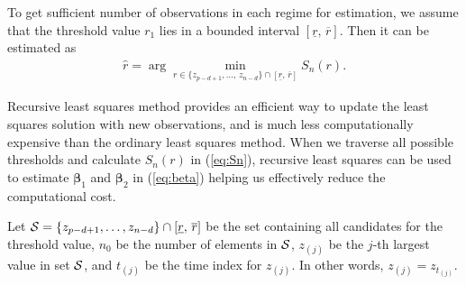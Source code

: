 To get sufficient number of observations in each regime for estimation, we assume that the threshold value $r_1$ lies in a bounded interval $[\underline{r}, \,\overline{r}]$. Then it can be estimated as
\begin{align}\label{eq:obj}
\hat{r}=\arg \min_{r \in \{z_{p-d+1},\ldots,\, z_{n-d}\} \cap [\underline{r},\, \overline{r}]} S_n(r).
\end{align}

 Recursive least squares method provides an efficient way to update the least squares solution with new observations, and is much less computationally expensive than the ordinary least squares method. When we traverse all possible thresholds and calculate $S_n(r)$ in (\ref{eq:Sn}),  recursive least squares can be used to estimate $\boldsymbol{\beta}_1$ and $\boldsymbol{\beta}_2$ in (\ref{eq:beta}) helping us effectively reduce the computational cost. 


Let ${\cal S}=\{{z}_{p-d+1},\ldots,{z}_{n-d}\}\cap [\underline{r},\, \overline{r}]$ be the set containing all candidates for the threshold value, $n_0$ be the number of elements in $\cal S$, ${z}_{(j)}$ be the $j$-th largest value in set $\cal S$, and $t_{(j)}$ be the time index for ${z}_{(j)}$. In other words, ${z}_{(j)}=z_{t_{(j)}}$.


